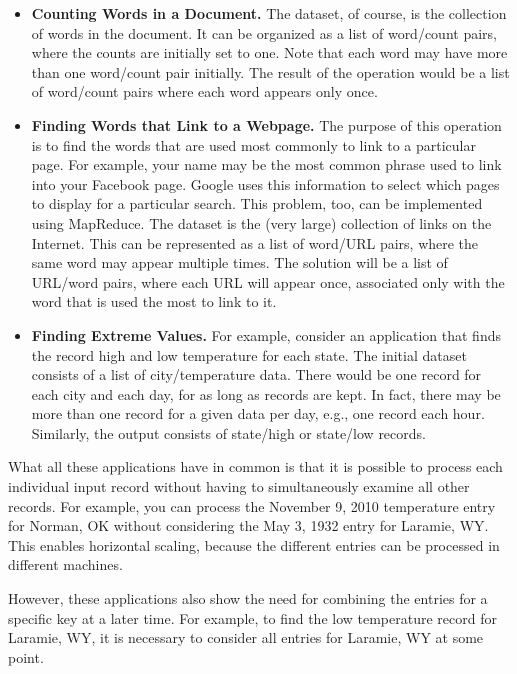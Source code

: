 \begin{itemize}
\item \textbf{Counting Words in a Document.}  The dataset, of
course, is the collection of words in the document.  It can be
organized as a list of word/count pairs, where the counts
are initially set to one.  Note that each word may have more
than one word/count pair initially.  The result of the
operation would be a list of word/count pairs where each word
appears only once.
\item \textbf{Finding Words that Link to a Webpage.}  The
purpose of this operation is to find the words that are used
most commonly to link to a particular page.  For example,
your name may be the most common phrase used to link into your
Facebook page.  Google uses this information to select which
pages to display for a particular search.  This problem, too,
can be implemented using MapReduce.  The dataset is the
(very large) collection of links on the Internet.  This can be
represented as a list of word/URL pairs, where the same word
may appear multiple times.  The solution will be a list of
URL/word pairs, where each URL will appear once, associated
only with the word that is used the most to link to it.
\item \textbf{Finding Extreme Values.}  For example, consider
an application that finds the record high and low temperature
for each state.  The initial dataset consists of a list of
city/temperature data.  There would be one record for each
city and each day, for as long as records are kept.  In fact,
there may be more than one record for a given data per day,
e.g., one record each hour.  Similarly, the output consists of
state/high or state/low records.
\end{itemize}

What all these applications have in common is that it is
possible to process each individual input record without
having to simultaneously examine all other records.  For
example, you can process the November 9, 2010 temperature
entry for Norman, OK without considering the May 3, 1932 entry
for Laramie, WY.  This enables horizontal scaling, because the
different entries can be processed in different machines.

However, these applications also show the need for combining
the entries for a specific key at a later time.  For example,
to find the low temperature record for Laramie, WY, it is
necessary to consider all entries for Laramie, WY at some
point.

